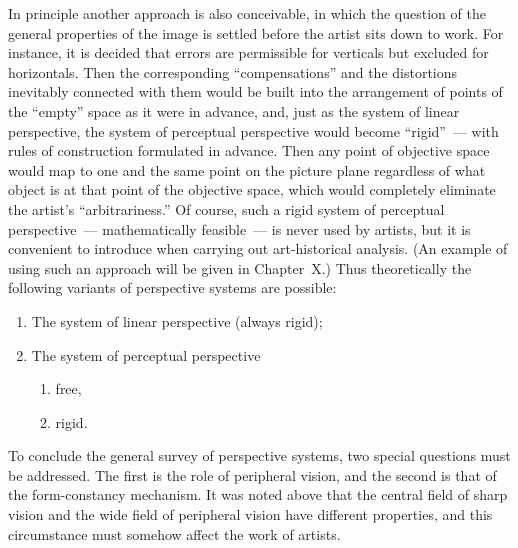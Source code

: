 
In principle another approach is also conceivable, in which the question of the general
properties of the image is settled before the artist sits down to work.  For instance, it
is decided that errors are permissible for verticals but excluded for horizontals.  Then
the corresponding ``compensations'' and the distortions inevitably connected with them
would be built into the arrangement of points of the ``empty'' space as it were in
advance, and, just as the system of linear perspective, the system of perceptual
perspective would become ``rigid''~--- with rules of construction formulated in advance.
Then any point of objective space would map to one and the same point on the picture
plane regardless of what object is at that point of the objective space, which would
completely eliminate the artist's ``arbitrariness.''  Of course, such a rigid system of
perceptual perspective~--- mathematically feasible~--- is never used by artists, but it is
convenient to introduce when carrying out art-historical analysis.  (An example of using
such an approach will be given in Chapter~X\@.)  Thus theoretically the following
variants of perspective systems are possible:

\begin{enumerate}
\item The system of linear perspective (always rigid);
\item The system of perceptual perspective
  \begin{enumerate}
  \item free,
  \item rigid.
  \end{enumerate}
\end{enumerate}

To conclude the general survey of perspective systems, two special questions must be
addressed.  The first is the role of peripheral vision, and the second is that of the
form-constancy mechanism.  It was noted above that the central field of sharp vision
and the wide field of peripheral vision have different properties, and this circumstance
must somehow affect the work of artists.

